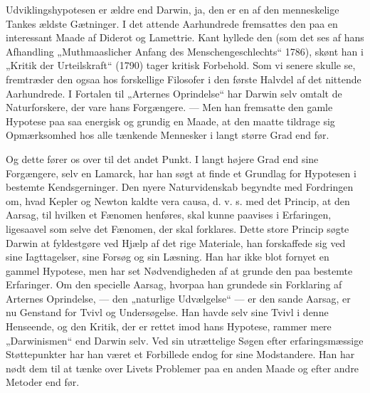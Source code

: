 \documentclass[12pt,a4paper,openany]{book}
\newcommand{\opage}[1]{\marginnote{\footnotesize\textit{[#1]}}}
\begin{document}
Udviklingshypotesen er ældre end Darwin, ja, den er en
af den menneskelige Tankes ældste Gætninger. I det attende
Aarhundrede fremsattes den paa en interessant Maade af Diderot
og Lamettrie. Kant hyllede den (som det ses af hans Afhandling
„Muthmaaslicher Anfang des Menschengeschlechts“ 1786),
skønt han i „Kritik der Urteilskraft“ (1790) tager kritisk Forbehold.
Som vi senere skulle se, fremtræder den ogsaa hos
forskellige Filosofer i den første Halvdel af det nittende Aarhundrede.
I Fortalen til „Arternes Oprindelse“ har Darwin
selv omtalt de Naturforskere, der vare hans Forgængere.
--- Men han fremsatte den gamle Hypotese paa saa energisk og
grundig en Maade, at den maatte tildrage sig Opmærksomhed
hos alle tænkende Mennesker i langt større Grad end før.

Og dette fører os over til det andet Punkt. I langt højere
Grad end sine Forgængere, selv en Lamarck, har han søgt at
finde et Grundlag for Hypotesen i bestemte Kendsgerninger.
\setcounter{footnote}{0}%
\opage{204}Den nyere Naturvidenskab begyndte med Fordringen om, hvad
Kepler og Newton kaldte vera causa, d. v. s. med det Princip,
at den Aarsag, til hvilken et Fænomen henføres, skal kunne
paavises i Erfaringen, ligesaavel som selve det Fænomen, der
skal forklares. Dette store Princip søgte Darwin at fyldestgøre
ved Hjælp af det rige Materiale, han forskaffede sig ved
sine Iagttagelser, sine Forsøg og sin Læsning. Han har ikke
blot fornyet en gammel Hypotese, men har set Nødvendigheden
af at grunde den paa bestemte Erfaringer. Om den specielle
Aarsag, hvorpaa han grundede sin Forklaring af Arternes Oprindelse,
--- den „naturlige Udvælgelse“ --- er den sande Aarsag,
er nu Genstand for Tvivl og Undersøgelse. Han havde
selv sine Tvivl i denne Henseende, og den Kritik, der er
rettet imod hans Hypotese, rammer mere „Darwinismen“ end
Darwin selv. Ved sin utrættelige Søgen efter erfaringsmæssige
Støttepunkter har han været et Forbillede endog for sine Modstandere.
Han har nødt dem til at tænke over Livets Problemer
paa en anden Maade og efter andre Metoder end før.
\end{document}
